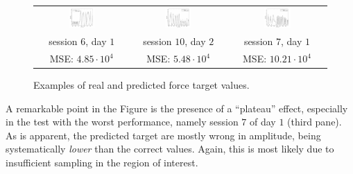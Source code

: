 \begin{figure}[!ht] \centering
  \begin{tabular}{ccc}
    \includegraphics[width=0.30\textwidth]{figs/fig_regression1.png} &
    \includegraphics[width=0.30\textwidth]{figs/fig_regression2.png} &
    \includegraphics[width=0.30\textwidth]{figs/fig_regression3.png} \\
    session $6$, day $1$ & session $10$, day $2$ & session $7$, day $1$ \\
    MSE: $4.85\cdot 10^4$ & MSE: $5.48\cdot 10^4$ & MSE: $10.21\cdot 10^4$ \\
  \end{tabular}
  \caption{Examples of real and predicted force target values.}
  \label{fig:regression}
\end{figure}

A remarkable point in the Figure is the presence of a ``plateau''
effect, especially in the test with the worst performance, namely
session $7$ of day $1$ (third pane). As is apparent, the predicted
target are mostly wrong in amplitude, being systematically
\emph{lower} than the correct values. Again, this is most likely due
to insufficient sampling in the region of interest.

